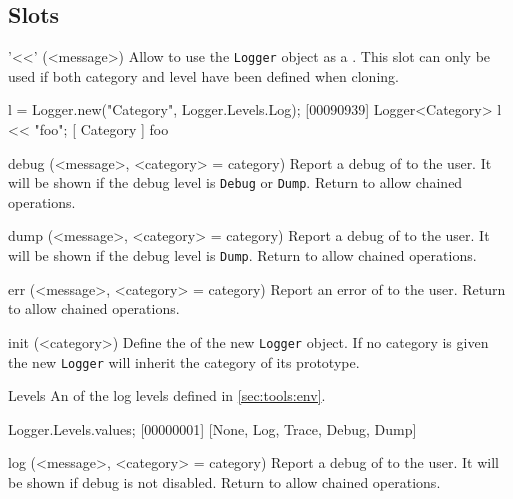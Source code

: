 \subsection{Slots}

\begin{urbiscriptapi}

\item['<<'](<message>)%
  Allow to use the \lstinline|Logger| object as a . This
  slot can only be used if both category and level have been defined when
  cloning.

\begin{urbiscript}
l = Logger.new("Category", Logger.Levels.Log);
[00090939] Logger<Category>
l << "foo";
[       Category        ] foo
\end{urbiscript}

\item[debug](<message>, <category> = category)%
  Report a debug  of  to the user. It will be
  shown if the debug level is \lstinline|Debug| or \lstinline|Dump|. Return
  \this to allow chained operations.

\item[dump](<message>, <category> = category)%
  Report a debug  of  to the user. It will be
  shown if the debug level is \lstinline|Dump|. Return \this to allow
  chained operations.

\item[err](<message>, <category> = category)%
  Report an error  of  to the user. Return \this
  to allow chained operations.

\item[init](<category>)%
  Define the  of the new \lstinline|Logger| object. If no
  category is given the new \lstinline|Logger| will inherit the category of
  its prototype.

\item[Levels]%
  An  of the log levels defined in
  \autoref{sec:tools:env}.

\begin{urbiscript}
Logger.Levels.values;
[00000001] [None, Log, Trace, Debug, Dump]
\end{urbiscript}

\item[log](<message>, <category> = category)%
  Report a debug  of  to the user. It will be
  shown if debug is not disabled. Return \this to allow chained operations.


\end{urbiscriptapi}
